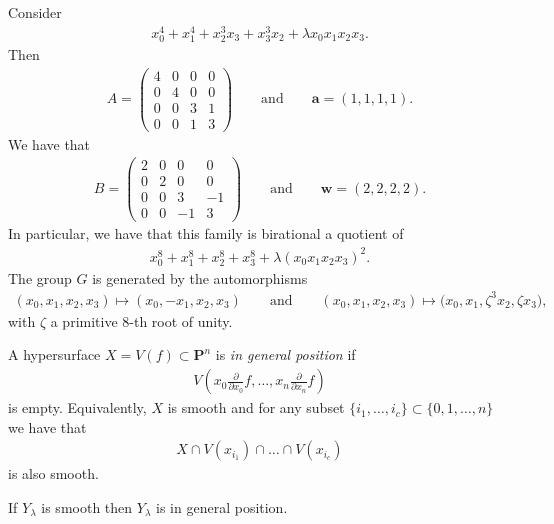\begin{Example} Consider
\begin{gather*} x_0^4+x_1^4+x_2^3x_3+x_3^3x_2+\lambda x_0x_1x_2x_3.\end{gather*}
Then
\begin{gather*} A=\left(\begin{matrix} 4&0&0&0\\0&4&0&0\\0&0&3&1\\0&0&1&3\end{matrix} \right) \qquad \text{and} \qquad \mathbf{a}=(1,1,1,1).\end{gather*}
We have that
\begin{gather*} B=\left(\begin{matrix} 2&0&0&0\\0&2&0&0\\0&0&3&-1\\0&0&-1&3\end{matrix} \right) \qquad \text{and} \qquad \mathbf{w}=(2,2,2,2). \end{gather*}
In particular, we have that this family is birational a quotient of
\begin{gather*} x_0^8+x_1^8+x_2^8+x_3^8+\lambda (x_0x_1x_2x_3)^2.\end{gather*}
The group $G$ is generated by the automorphisms
\begin{gather*} (x_0,x_1,x_2,x_3)\mapsto(x_0,-x_1,x_2,x_3)\qquad \text{and} \qquad
(x_0,x_1,x_2,x_3)\mapsto\big(x_0,x_1,\zeta^3 x_2,\zeta x_3\big),\end{gather*} with $\zeta$ a primitive $8$-th root of unity.
\end{Example}

\begin{Definition}\label{defGenPos} A hypersurface $X=V(f)\subset \mathbf{P}^n$ is \emph{in general position} if
\begin{gather*} V\left(x_0\frac{\partial}{\partial{x_0}} f, \dots,x_n\frac{\partial}{\partial{x_n}} f\right)\end{gather*}
is empty. Equivalently, $X$ is smooth and for any subset $\{i_1,\dots,i_c\} \subset \{0,1,\dots,n\}$ we have that
\begin{gather*} X \cap V(x_{i_1})\cap \dots \cap V(x_{i_c})\end{gather*}
is also smooth.
\end{Definition}

\begin{Lemma}\label{lemGenPos} If $Y_\lambda$ is smooth then $Y_{\lambda}$ is in general position.
\end{Lemma}

